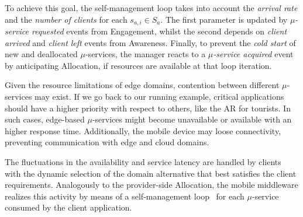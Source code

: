 To achieve this goal, the self-management loop takes into account the \textit{arrival rate} and the \textit{number of clients} for each $s_{a,i} \in S_a$. The first parameter is updated by \textit{$\mu$-service requested} events from Engagement, whilst the second depends on \textit{client arrived} and \textit{client left} events from Awareness. Finally, to prevent the \textit{cold start} of new and deallocated $\mu$-services, the manager reacts to a \textit{$\mu$-service acquired} event by anticipating Allocation, if resources are available at that loop iteration. 


Given the resource limitations of edge domains, contention between different $\mu$-services may exist. If we go back to our running example,
critical applications should have a higher priority with respect to others, like the AR for tourists. In such cases, edge-based $\mu$-services might become unavailable or available with an higher response time. Additionally, the mobile device may loose connectivity, preventing communication with edge and cloud domains. 




The fluctuations in the availability and service latency are handled by clients with the dynamic selection of the domain alternative that best satisfies the client requirements. Analogously to the provider-side Allocation, the mobile middleware realizes this activity by means of a self-management loop~\cite{kephart2003vision} for each $\mu$-service consumed by the client application.

